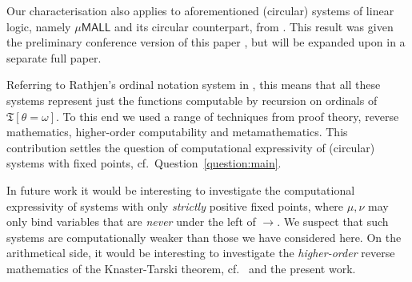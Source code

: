 \documentclass[10pt,a4paper]{amsart}
\theoremstyle{plain}
\theoremstyle{definition}
\newcommand{\blue}[1]{{\color{blue}#1}}
\newcommand{\comment}[1]{\blue{#1}}
\renewcommand{\comment}[1]{}
\theoremstyle{plain}
\theoremstyle{definition} %
\newcommand{\arrow}{\to}
\newcommand{\LJ}{\mathsf{LJ}}
\newcommand{\muLJ}{\mu\LJ}
\newcommand{\circular}{\mathsf C}
\newcommand{\cmuLJ}{\circular\muLJ}
\newcommand{\MALL}{\mathsf{MALL}}
\newcommand{\muMALL}{\mu\MALL}
\begin{document}
Our characterisation also applies to aforementioned (circular) systems of linear logic, namely $\muMALL$ and its circular counterpart, from \cite{BaeldeMiller07,Baelde12,BaeldeDS16Infinitaryprooftheory,EhrJaf21:cat-models-muLL,EhrJafSau21:totality-CmuMALL,BDKS22:bouncing-threads,DeSau19:infinets1,DePelSau:infinets2,DeJafSau22:phase-semantics}.
This result was given the preliminary conference version of this paper \cite{CD23:muLJ-lics}, but will be expanded upon in a separate full paper.


Referring to Rathjen's ordinal notation system in \cite{Rathjen95:recent-advances}, this means that all these systems represent just the functions computable by recursion on ordinals of $\mathfrak T[\theta = \omega]$.
To this end we used a range of techniques from proof theory, reverse mathematics, higher-order computability and metamathematics.
This contribution settles the question of computational expressivity of (circular) systems with fixed points, cf.~Question~\ref{question:main}.

In future work it would be interesting to investigate the computational expressivity of systems with only \emph{strictly} positive fixed points, where $\mu,\nu$ may only bind variables that are \emph{never} under the left of $\arrow$.
We suspect that such systems are computationally weaker than those we have considered here.
On the arithmetical side, it would be interesting to investigate the \emph{higher-order} reverse mathematics of the Knaster-Tarski theorem, cf.~\cite{SatoYamazaki17:rev-math-fixed-point-thms-with-kt} and the present work.

\comment{
\begin{itemize}
    \item what about strict positivity? conjecture weaker.
    \item we could first translate into a well-founded system, but this will not (immediately) give us effective ordinal bounds for formalisation. (Actually this is an interesting idea)
\end{itemize}
}

\clearpage
\appendix




\end{document}
